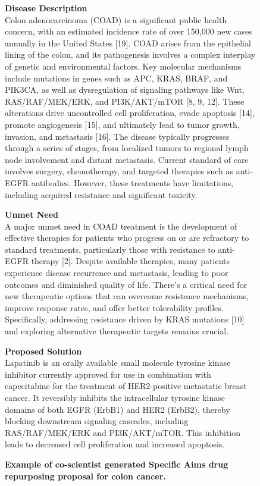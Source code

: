 \begin{figure}[htbp!]
\caption{\textbf{Example of co-scientist generated Specific Aims drug repurposing proposal for colon cancer.}}
\label{fig:aim3_1}
\vspace{0.1cm}
\begin{tcolorbox}[title=Lapatinib for colon cancer]
\footnotesize
\textbf{Disease Description}\\
Colon adenocarcinoma (COAD) is a significant public health concern, with an estimated incidence rate of over 150,000 new cases annually in the United States [19]. COAD arises from the epithelial lining of the colon, and its pathogenesis involves a complex interplay of genetic and environmental factors. Key molecular mechanisms include mutations in genes such as APC, KRAS, BRAF, and PIK3CA, as well as dysregulation of signaling pathways like Wnt, RAS/RAF/MEK/ERK, and PI3K/AKT/mTOR [8, 9, 12]. These alterations drive uncontrolled cell proliferation, evade apoptosis [14], promote angiogenesis [15], and ultimately lead to tumor growth, invasion, and metastasis [16]. The disease typically progresses through a series of stages, from localized tumors to regional lymph node involvement and distant metastasis. Current standard of care involves surgery, chemotherapy, and targeted therapies such as anti-EGFR antibodies. However, these treatments have limitations, including acquired resistance and significant toxicity.

\textbf{Unmet Need}\\
A major unmet need in COAD treatment is the development of effective therapies for patients who progress on or are refractory to standard treatments, particularly those with resistance to anti-EGFR therapy [2]. Despite available therapies, many patients experience disease recurrence and metastasis, leading to poor outcomes and diminished quality of life. There's a critical need for new therapeutic options that can overcome resistance mechanisms, improve response rates, and offer better tolerability profiles. Specifically, addressing resistance driven by KRAS mutations [10] and exploring alternative therapeutic targets remains crucial.

\textbf{Proposed Solution}\\
Lapatinib is an orally available small molecule tyrosine kinase inhibitor currently approved for use in combination with capecitabine for the treatment of HER2-positive metastatic breast cancer. It reversibly inhibits the intracellular tyrosine kinase domains of both EGFR (ErbB1) and HER2 (ErbB2), thereby blocking downstream signaling cascades, including RAS/RAF/MEK/ERK and PI3K/AKT/mTOR. This inhibition leads to decreased cell proliferation and increased apoptosis.


\end{tcolorbox}
\end{figure}
